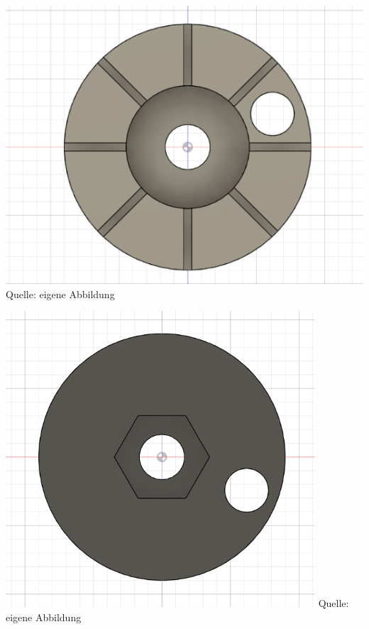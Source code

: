 \documentclass[ngerman,12pt,a4paper]{article}
\begin{document}
	\begin{center}
		\begin{minipage}{0.4\linewidth}
			\centering
			\includegraphics{Pictures/Verbindungselement-1}
			\label{fig:Verbindungselement-1}
			\small Quelle: eigene Abbildung
		\end{minipage}
		\hfill
		\begin{minipage}{0.4\linewidth}
			\centering
			\includegraphics{Pictures/Verbindungselement-2}
			\label{fig:Verbindungselement-2}
			\small Quelle: eigene Abbildung

\end{minipage}
\end{center}
\end{document}

